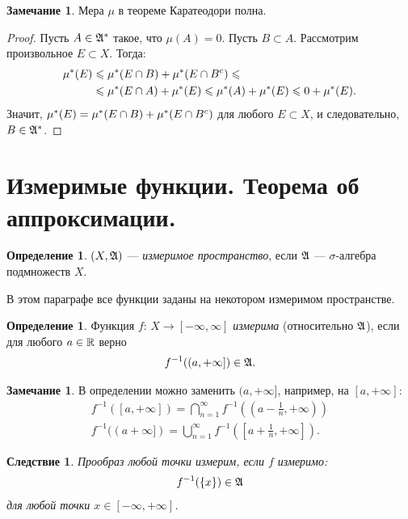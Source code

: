\documentclass[a4paper,14pt]{extarticle}
\newcounter{theoremCnt}
\theoremstyle{definition}
\newtheorem{df}[theoremCnt]{Определение}
\theoremstyle{plain}
\theoremstyle{plain}
\theoremstyle{plain}
\newtheorem{crly}[theoremCnt]{Следствие}
\theoremstyle{plain}
\theoremstyle{definition}
\theoremstyle{definition}
\newtheorem{remrk}[theoremCnt]{Замечание}
\theoremstyle{definition}
\theoremstyle{definition}
\theoremstyle{definition}
\theoremstyle{definition}
\theoremstyle{plain}
\theoremstyle{plain}
\theoremstyle{plain}
\theoremstyle{plain}
\theoremstyle{definition}
\theoremstyle{definition}
\theoremstyle{definition}
\theoremstyle{definition}
\theoremstyle{definition}
\newcommand{\R}{\ensuremath \mathbb{R}}
\newcommand{\A}{\ensuremath \mathfrak{A}}
\newcommand{\mua}{\ensuremath \mu^\ast}
\begin{document}
\begin{remrk}
 Мера $\mu$ в теореме Каратеодори полна.
\end{remrk}
\begin{proof}
 Пусть $A \in \A^{\ast}$ такое, что $\mu(A) = 0$. Пусть  $B \subset A$. Рассмотрим произвольное $E \subset X$. Тогда:
 \begin{align*}
  \mua(E) & \leqslant \mua(E \cap B) + \mua(E \cap B^{c}) \leqslant \\
          & \leqslant \mua(E \cap A) + \mua(E) \leqslant \mua(A) + \mua(E) \leqslant 0 + \mua(E)
  .\end{align*} Значит, $\mua(E) = \mua(E \cap B) + \mua(E \cap B^{c})$ для любого $E \subset X$, и следовательно, $B \in \A^{\ast}$.
\end{proof}
\section{Измеримые функции. Теорема об аппроксимации.}
\begin{df}
 $(X, \A)$ --- \textit{измеримое пространство}, если  $\A$ ---  $\sigma$-алгебра подмножеств $X$.
\end{df}
В этом параграфе все функции заданы на некотором измеримом пространстве.
\begin{df}
 Функция $f \colon\, X \to [-\infty, \infty] $ \textit{измерима} (относительно $\A$), если для любого $a \in \R$ верно
 \begin{align*}
  f^{-1}((a, +\infty]) \in \A
  .\end{align*}
\end{df}
\begin{remrk}
 В определении можно заменить $(a, +\infty]$, например, на  $[a, +\infty]$:
 \begin{align*}
  f^{-1}([a, +\infty]) = \bigcap_{n=1}^{\infty} f^{-1}\left(\left(a - \frac{1}{n}, +\infty \right)\right) \\
  f^{-1}((a +\infty]) = \bigcup_{n=1}^{\infty}  f^{-1} \left( [a + \frac{1}{n}, +\infty] \right)
  .\end{align*}
\end{remrk}
\begin{crly}
 Прообраз любой точки измерим, если $f$ измеримо:
 \begin{align*}
  f^{-1}(\left\{ x \right\}) \in \A
 \end{align*} для любой точки $x \in [-\infty, +\infty]$.
\end{crly}
\end{document}
